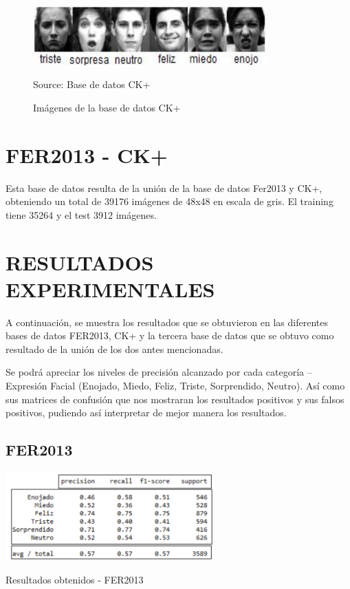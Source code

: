 \begin{figure}[H]
		\centering
		\includegraphics[width=90mm]{Imagenes/imagenes_ck+.png}
		\caption{Imágenes de la base de datos CK+}
		Source: Base de datos CK+
		\label{fig:imagenes_ck+}
\end{figure}


\section{FER2013 - CK+}
Esta base de datos resulta de la unión de la base de datos Fer2013 y CK+,
obteniendo un total de 39176 imágenes de 48x48 en escala de gris. El training tiene 35264
y el test 3912 imágenes.

\section{RESULTADOS EXPERIMENTALES}
\label{sec:experiment}
A continuación, se muestra los resultados que se obtuvieron en las diferentes bases
de datos FER2013, CK+ y la tercera base de datos que se obtuvo como resultado de la
unión de los dos antes mencionadas.

Se podrá apreciar los niveles de precisión alcanzado por cada categoría –
Expresión Facial (Enojado, Miedo, Feliz, Triste, Sorprendido, Neutro). Así como sus
matrices de confusión que nos mostraran los resultados positivos y sus falsos positivos,
pudiendo así interpretar de mejor manera los resultados.

\subsection{FER2013}

\begin{table}[H]
    \centering
    \includegraphics[width=80mm]{Imagenes/tabla_resultados_fer.png} 
    \caption{Resultados obtenidos - FER2013}
    \label{tab:tabla_resultados_fer}
\end{table}

